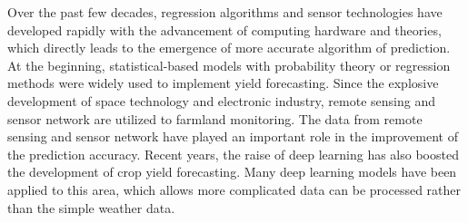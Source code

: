 \documentclass[conference]{IEEEtran}
\begin{document}
  Over the past few decades, regression algorithms and sensor technologies have developed rapidly with the advancement of computing hardware and theories, which directly leads to the emergence of more accurate algorithm of prediction. At the beginning, statistical-based models with probability theory or regression methods were widely used to implement yield forecasting\cite{Matis1985, stephens1995crop}. Since the explosive development of space technology and electronic industry, remote sensing and sensor network are utilized to farmland monitoring.  The data from remote sensing and sensor network have played an important role in the improvement of the prediction accuracy\cite{You2017, Baruth}. Recent years, the raise of deep learning has also boosted the development of crop yield forecasting. Many deep learning models have been applied to this area, which allows more complicated data can be processed rather than the simple weather data.
  
  

\end{document}
